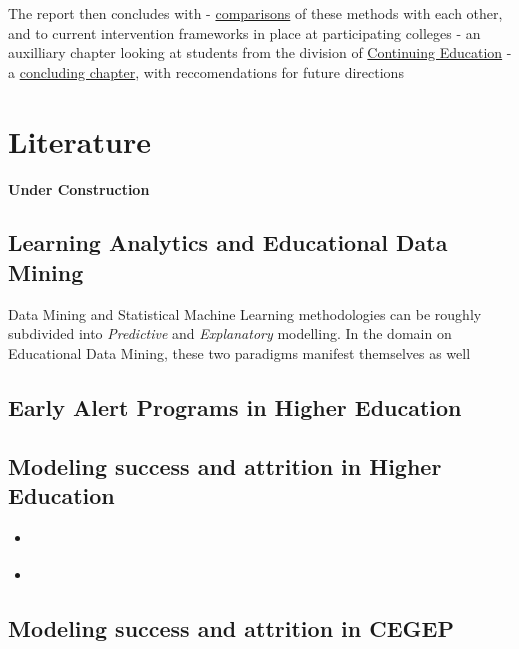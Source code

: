 \documentclass[]{book}
\providecommand{\tightlist}{%
  \setlength{\itemsep}{0pt}\setlength{\parskip}{0pt}}
\theoremstyle{definition}
\theoremstyle{definition}
\theoremstyle{remark}
\begin{document}
The report then concludes with -
\protect\hyperlink{comparisons}{comparisons} of these methods with each
other, and to current intervention frameworks in place at participating
colleges - an auxilliary chapter looking at students from the division
of \protect\hyperlink{conted}{Continuing Education} - a
\protect\hyperlink{conclusion}{concluding chapter}, with reccomendations
for future directions

\hypertarget{littreview}{\chapter{Literature}\label{littreview}}

\textbf{Under Construction }

\section{Learning Analytics and Educational Data
Mining}\label{learning-analytics-and-educational-data-mining}

Data Mining and Statistical Machine Learning methodologies can be
roughly subdivided into \emph{Predictive} and \emph{Explanatory}
modelling\citep{shmueli2010explain}. In the domain on Educational Data
Mining, these two paradigms manifest themselves as
well\citep{hla2017Liu}

\section{Early Alert Programs in Higher
Education}\label{early-alert-programs-in-higher-education}

\citep{simons2011EarlyAlert}

\section{Modeling success and attrition in Higher
Education}\label{modeling-success-and-attrition-in-higher-education}

\begin{itemize}
\tightlist
\item
  \citep{singell_RHE_2010ModelingRetention}
\item
  \citep{tinto1987Attrition}
\end{itemize}

\section{Modeling success and attrition in
CEGEP}\label{modeling-success-and-attrition-in-cegep}
\end{document}
